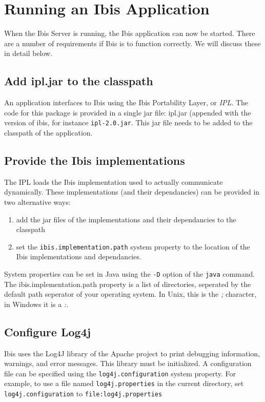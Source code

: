 \documentclass[10pt]{article}
\begin{document}
\section{Running an Ibis Application}

When the Ibis Server is running, the Ibis application can now be
started. There are a number of requirements if Ibis is to function
correctly. We will discuss these in detail below.

\subsection{Add ipl.jar to the classpath}

An application interfaces to Ibis using the Ibis Portability Layer, or
\emph{IPL}. The code for this package is provided in a single jar file:
ipl.jar (appended with the version of ibis, for instance \texttt{ipl-2.0.jar}.
This jar file needs to be added to the classpath of the application.

\subsection{Provide the Ibis implementations}

The IPL loads the Ibis implementation used to actually communicate
dynamically. These implementations (and their dependancies) can be
provided in two alternative ways:

\begin{enumerate} 
\item add the jar files of the implementations and their dependancies to
      the classpath 
\item set the \texttt{ibis.implementation.path} system property to the
      location of the Ibis implementations and dependancies.  
\end{enumerate}

System properties can be set in Java using the \texttt{-D} option of the
\texttt{java} command. The ibis.implementation.path property is a list
of directories, seperated by the default path seperator of your
operating system. In Unix, this is the \emph{;} character, in Windows it
is a \emph{:}.

\subsection{Configure Log4j}

Ibis uses the Log4J library of the Apache project to print debugging
information, warnings, and error messages. This library must be
initialized. A configuration file can be specified using the
\texttt{log4j.configuration} system property. For example, to use a file
named \texttt{log4j.properties} in the current directory, set
\texttt{log4j.configuration} to \texttt{file:log4j.properties}
\end{document}

